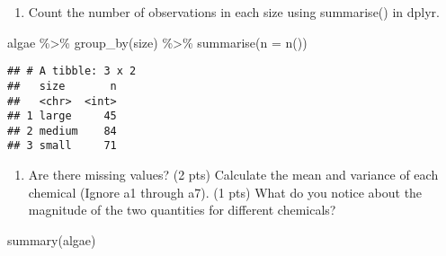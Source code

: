 \documentclass[
]{article}
\newenvironment{Shaded}{\begin{snugshade}}{\end{snugshade}}
\newcommand{\AttributeTok}[1]{\textcolor[rgb]{0.77,0.63,0.00}{#1}}
\newcommand{\FunctionTok}[1]{\textcolor[rgb]{0.00,0.00,0.00}{#1}}
\newcommand{\NormalTok}[1]{#1}
\newcommand{\SpecialCharTok}[1]{\textcolor[rgb]{0.00,0.00,0.00}{#1}}
\providecommand{\tightlist}{%
  \setlength{\itemsep}{0pt}\setlength{\parskip}{0pt}}
\begin{document}
\begin{enumerate}
\def\labelenumi{\alph{enumi}.}
\tightlist
\item
  Count the number of observations in each size using summarise() in
  dplyr.
\end{enumerate}

\begin{Shaded}
\begin{Highlighting}[]
\NormalTok{algae }\SpecialCharTok{\%\textgreater{}\%}
  \FunctionTok{group\_by}\NormalTok{(size) }\SpecialCharTok{\%\textgreater{}\%}
    \FunctionTok{summarise}\NormalTok{(}\AttributeTok{n =} \FunctionTok{n}\NormalTok{())}
\end{Highlighting}
\end{Shaded}

\begin{verbatim}
## # A tibble: 3 x 2
##   size       n
##   <chr>  <int>
## 1 large     45
## 2 medium    84
## 3 small     71
\end{verbatim}

\begin{enumerate}
\def\labelenumi{\alph{enumi}.}
\setcounter{enumi}{1}
\tightlist
\item
  Are there missing values? (2 pts) Calculate the mean and variance of
  each chemical (Ignore a1 through a7). (1 pts) What do you notice about
  the magnitude of the two quantities for different chemicals?
\end{enumerate}

\begin{Shaded}
\begin{Highlighting}[]
\FunctionTok{summary}\NormalTok{(algae)}
\end{Highlighting}
\end{Shaded}
\end{document}
